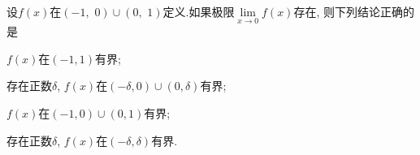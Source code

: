 \begin{problem}
	设$f(x)$在$\left( - 1, \mspace{6mu} 0 \right) \cup \left( 0, \mspace{6mu} 1 \right)$定义.如果极限$\lim\limits_{x \rightarrow 0}f(x)$存在, 则下列结论正确的是
		
		\begin{abcd} 
			\item $f(x)$在$(- 1, 1)$有界;
			
			\item
			存在正数$\delta$, $f(x)$在$\left( - \delta, 0 \right) \cup \left( 0, \delta \right)$有界;
			
			\item $f(x)$在$\left( - 1, 0 \right) \cup \left( 0, 1 \right)$有界;
			
			\item 存在正数$\delta$, $f(x)$在$\left( - \delta, \delta \right)$有界.
			
		\end{abcd}
		
		
	\end{problem} 



